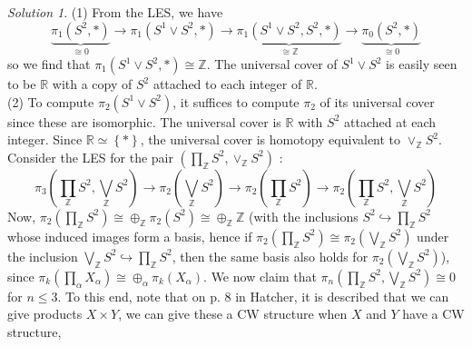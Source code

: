 \documentclass[reqno]{amsart}
\theoremstyle{definition}
\theoremstyle{remark}
\newtheorem*{solution}{Solution}
\begin{document}
    \begin{solution}
        (1) From the LES, we have
        \[
            \underbrace{\pi_1 \left( S^2, * \right)}_{
            \cong 0} \to 
        \pi_1 \left( S^{1} \vee S^2, * \right) 
        \to 
        \underbrace{\pi_1 \left( S^{1} \vee S^2, S^2 , * \right)}_{
        \cong \mathbb{Z}}
        \to \underbrace{\pi_0 \left( S^2, * \right)}_{\cong 0}
        \] 
        so we find that
        $\pi_1 \left( S^{1} \vee S^2, * \right) 
        \cong \mathbb{Z}$.
        The universal cover of $S^{1} \vee S^2$ is
        easily seen to be
        $\mathbb{R}$ with a copy of $S^2$ attached to
        each integer of $\mathbb{R}$.\\
        (2) To compute
        $\pi_2 \left( S^{1} \vee S^2 \right) $, it suffices
        to compute $\pi_2$ of its universal cover since
        these are isomorphic. The universal cover
        is $\mathbb{R}$ with $S^2$ attached at each integer.
        Since $\mathbb{R} \simeq \left\{ * \right\}$, the
        universal cover is homotopy equivalent to
        $\vee_{\mathbb{Z}} S^2$.
        Consider the LES for the pair
        $\left( \prod_{\mathbb{Z}} S^2, 
        \vee_{\mathbb{Z}} S^2 \right) $ :
        \[
        \pi_{3} \left( \prod_{\mathbb{Z}} S^2, 
        \bigvee_{\mathbb{Z}} S^2\right) \to 
        \pi_2 \left( \bigvee_{\mathbb{Z}} S^2 \right)
        \to \pi_2 \left( \prod_{\mathbb{Z}} S^2 \right) 
        \to \pi_2 \left( \prod_{\mathbb{Z}} S^2,
        \bigvee_{\mathbb{Z}} S^2 \right) 
        \] 
        Now,
        $\pi_{2}\left( \prod_{\mathbb{Z}}S^2 \right) 
        \cong \oplus_{\mathbb{Z}} \pi_2 \left( S^2 \right) 
        \cong \oplus_{\mathbb{Z}} \mathbb{Z}$ (with
        the inclusions
        $S^2 \hookrightarrow \prod_{\mathbb{Z}}S^2$ 
        whose induced images form a basis, hence
        if $\pi_2 \left( \prod_{\mathbb{Z}} S^2 \right) 
        \cong \pi_2 \left( \bigvee_{\mathbb{Z}}S^2 \right) $ 
        under the inclusion
        $\bigvee_{\mathbb{Z}}S^2 \hookrightarrow 
        \prod_{\mathbb{Z}}S^2$, then
        the same basis also holds for
        $\pi_2 \left( \bigvee_{\mathbb{Z}}S^2 \right) $), since
        $\pi_k \left( \prod_{\alpha} X_\alpha \right) \cong
        \oplus_{\alpha} \pi_k \left( X_{\alpha} \right) $.
        We now claim that
        $\pi_n \left( 
        \prod_{\mathbb{Z}} S^2, 
    \bigvee_{\mathbb{Z}} S^2 \right) \cong 0$ for
    $n \le 3$. To this end,
    note that on p. 8 in Hatcher, it is described that
    we can give products $X \times Y$, we can give
    these a CW structure when $X$ and $Y$ have a CW structure,

\end{solution}
\end{document}
